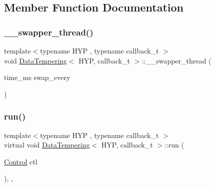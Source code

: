 \subsection{Member Function Documentation}
\mbox{\label{class_data_tempering_a878981d5b443b50348fcd25a03135609}} 
\subsubsection{\texorpdfstring{\+\_\+\+\_\+swapper\+\_\+thread()}{\_\_swapper\_thread()}}
{\footnotesize\ttfamily template$<$typename H\+YP , typename callback\+\_\+t $>$ \\
void \hyperlink{class_data_tempering}{Data\+Tempering}$<$ H\+YP, callback\+\_\+t $>$\+::\+\_\+\+\_\+swapper\+\_\+thread (\begin{DoxyParamCaption}\item[{time\+\_\+ms}]{swap\+\_\+every }\end{DoxyParamCaption})\hspace{0.3cm}{\ttfamily [inline]}}

\mbox{\label{class_data_tempering_a47b07f1c97e7f65b7694efdaa088039b}} 
\subsubsection{\texorpdfstring{run()}{run()}\hspace{0.1cm}{\footnotesize\ttfamily [1/2]}}
{\footnotesize\ttfamily template$<$typename H\+YP , typename callback\+\_\+t $>$ \\
virtual void \hyperlink{class_data_tempering}{Data\+Tempering}$<$ H\+YP, callback\+\_\+t $>$\+::run (\begin{DoxyParamCaption}\item[{\hyperlink{struct_control}{Control}}]{ctl }\end{DoxyParamCaption})\hspace{0.3cm}{\ttfamily [inline]}, {\ttfamily [override]}, {\ttfamily [virtual]}}

\mbox{\label{class_data_tempering_ae1fbeeddd743c7f70c2df1a4ff458f0e}} 
